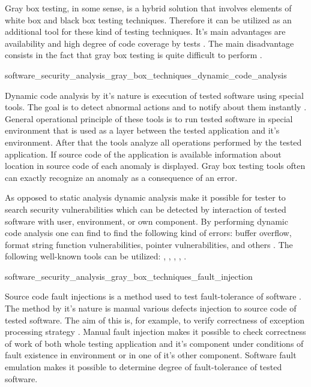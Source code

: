 %
Gray box testing, in some sense, is a hybrid solution that involves elements of white box and black box testing techniques. 
%
Therefore it can be utilized as an additional tool for these kind of testing techniques. 
%
It's main advantages are availability and high degree of code coverage by tests . 
%
The main disadvantage consists in the fact that gray box testing is quite difficult to perform . 


	{software_security_analysis_gray_box_techniques_dynamic_code_analysis}

%
Dynamic code analysis by it's nature is execution of tested software using special tools. 
%
The goal is to detect abnormal actions and to notify about them instantly . 
%
General operational principle of these tools is to run tested software in special environment that is used as a layer between the tested application and it's environment. 
%
After that the tools analyze all operations performed by the tested application. 
%
If source code of the application is available information about location in source code of each anomaly is displayed. 
%
Gray box testing tools often can exactly recognize an anomaly as a consequence of an error. 

%
As opposed to static analysis dynamic analysis make it possible for tester to search security vulnerabilities which can be detected by interaction of tested software with user, environment, or own component. 
%
By performing dynamic code analysis one can find to find the following kind of errors: buffer overflow, format string function vulnerabilities, pointer vulnerabilities, and others . 
%
The following well-known tools can be utilized:  ,  ,  ,  ,  . 


	{software_security_analysis_gray_box_techniques_fault_injection}

%
Source code fault injections is a method used to test fault-tolerance of software . 
%
The method by it's nature is manual various defects injection to source code of tested software. 
%
The aim of this is, for example, to verify correctness of exception processing strategy . 
%
Manual fault injection makes it possible to check correctness of work of both whole testing application and it's component under conditions of fault existence in environment or in one of it's other component. 
%
Software fault emulation makes it possible to determine degree of fault-tolerance of tested software. 

